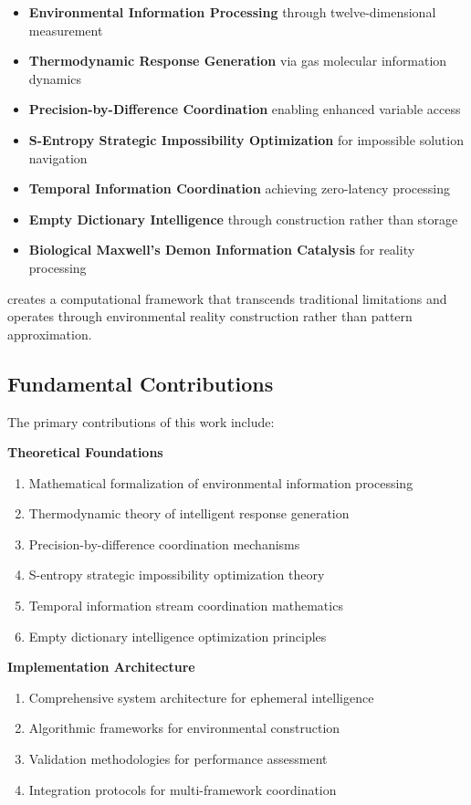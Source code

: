 \documentclass[12pt,a4paper]{article}
\begin{document}
\begin{itemize}
\item \textbf{Environmental Information Processing} through twelve-dimensional measurement
\item \textbf{Thermodynamic Response Generation} via gas molecular information dynamics
\item \textbf{Precision-by-Difference Coordination} enabling enhanced variable access
\item \textbf{S-Entropy Strategic Impossibility Optimization} for impossible solution navigation
\item \textbf{Temporal Information Coordination} achieving zero-latency processing
\item \textbf{Empty Dictionary Intelligence} through construction rather than storage
\item \textbf{Biological Maxwell's Demon Information Catalysis} for reality processing
\end{itemize}

creates a computational framework that transcends traditional limitations and operates through environmental reality construction rather than pattern approximation.

\subsection{Fundamental Contributions}

The primary contributions of this work include:

\textbf{Theoretical Foundations}
\begin{enumerate}
\item Mathematical formalization of environmental information processing
\item Thermodynamic theory of intelligent response generation
\item Precision-by-difference coordination mechanisms
\item S-entropy strategic impossibility optimization theory
\item Temporal information stream coordination mathematics
\item Empty dictionary intelligence optimization principles
\end{enumerate}

\textbf{Implementation Architecture}
\begin{enumerate}
\item Comprehensive system architecture for ephemeral intelligence
\item Algorithmic frameworks for environmental construction
\item Validation methodologies for performance assessment
\item Integration protocols for multi-framework coordination
\end{enumerate}
\end{document}
